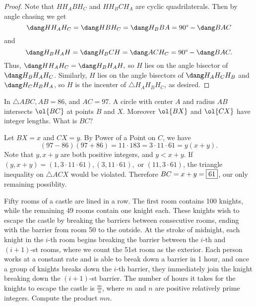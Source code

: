 \documentclass[letterpaper,oneside]{scrartcl}
\begin{document}
\begin{proof}
  Note that \(HH_ABH_C\) and \(HH_BCH_A\) are cyclic quadrilaterals. Then by angle chasing we get
  \[\dang HH_AH_C = \dang HBH_C = \dang H_BBA = 90\degree - \dang BAC\]
  and
  \[\dang H_BH_AH = \dang H_BCH = \dang ACH_C = 90\degree - \dang BAC.\]
  Thus, \(\dang HH_AH_C = \dang H_BH_AH,\) so \(H\) lies on the angle bisector of \(\dang H_BH_AH_C\). Similarly, \(H\) lies on the angle bisectors of \(\dang H_AH_CH_B\) and \(\dang H_CH_BH_A\), so \(H\) is the incenter of \(\triangle H_AH_BH_C\), as desired.
\end{proof}
\newpage
\begin{problem*}
   In \(\triangle ABC, AB = 86\), and \(AC = 97\). A circle with center \(A\) and radius \(AB\) intersects \(\ol{BC}\) at points \(B\) and \(X\). Moreover \(\ol{BX}\) and \(\ol{CX}\) have integer lengths. What is \(BC\)?
\end{problem*}
\begin{soln}
  Let \(BX = x\) and \(CX = y\). By Power of a Point on \(C\), we have 
  \[(97-86)(97+86) = 11\cdot183 = 3\cdot11\cdot61=y(x+y).\]
  Note that \(y,x+y\) are both positive integers, and \(y<x+y\). If \((y,x+y) = (1,3\cdot11\cdot61),(3,11\cdot61),\) or \((11,3\cdot61)\), the triangle inequality on \(\triangle ACX\) would be violated. Therefore \(BC = x+y = \fbox{61}\), our only remaining possiblity.
\end{soln}
\begin{problem*}
  Fifty rooms of a castle are lined in a row. The first room contains 100 knights, while the remaining 49 rooms contain one knight each. These knights wish to escape the castle by breaking the barriers between consecutive rooms, ending with the barrier from room 50 to the outside. At the stroke of midnight, each knight in the \(i\)-th room begins breaking the barrier between the \(i\)-th and \((i + 1)\)-st rooms, where we count the 51st room as the exterior. Each person works at a constant rate and is able to break down a barrier in 1 hour, and once a group of knights breaks down the \(i\)-th barrier, they immediately join the knight breaking down the \((i + 1)\)-st barrier. The number of hours it takes for the knights to escape the castle is \(\tfrac{m}{n}\), where \(m\) and \(n\) are positive relatively prime integers. Compute the product \(mn\).
\end{problem*}
\end{document}
